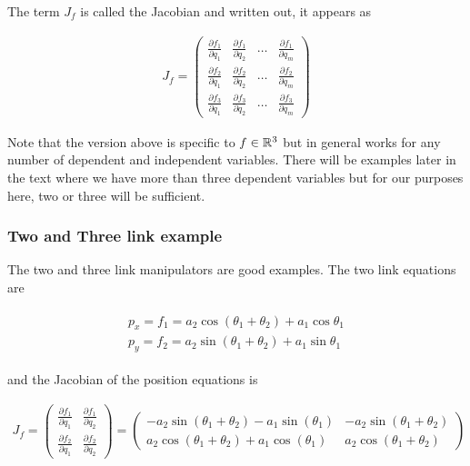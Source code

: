 The term \(J_f\) is called the Jacobian and written out, it appears as

\[\begin{aligned}
J_f = \begin{pmatrix}  \frac{\partial f_1} {\partial q_1} & \frac{\partial f_1} {\partial q_2} & \dots & \frac{\partial f_1} {\partial q_m} \\[3mm]
 \frac{\partial f_2} {\partial q_1} & \frac{\partial f_2} {\partial q_2} & \dots & \frac{\partial f_2} {\partial q_m} \\[3mm]
 \frac{\partial f_3} {\partial q_1} & \frac{\partial f_3} {\partial q_2} & \dots & \frac{\partial f_3} {\partial q_m} \end{pmatrix}
\end{aligned}\]

Note that the version above is specific to \(f \in {\Bbb R}^3\) but in
general works for any number of dependent and independent variables.
There will be examples later in the text where we have more than three
dependent variables but for our purposes here, two or three will be
sufficient.

\hypertarget{two-and-three-link-example}{%
\subsubsection{Two and Three link
example}\label{two-and-three-link-example}}

The two and three link manipulators are good examples. The two link
equations are

\[\begin{aligned}
\begin{matrix}
p_x = f_1 = a_2\cos (\theta_1+\theta_2) + a_1 \cos \theta_1 \\
p_y = f_2 = a_2 \sin (\theta_1 +\theta_2) + a_1\sin \theta_1
\end{matrix}
\end{aligned}\]

and the Jacobian of the position equations is

\[\begin{aligned}
J_f = \begin{pmatrix}  \frac{\partial f_1} {\partial q_1} & \frac{\partial f_1} {\partial q_2}  \\[2mm]
 \frac{\partial f_2} {\partial q_1} & \frac{\partial f_2} {\partial q_2}  \end{pmatrix}
 = \begin{pmatrix}  -a_2\sin(\theta_1+\theta_2) - a_1\sin(\theta_1) & -a_2\sin(\theta_1+\theta_2)  \\[2mm]
  a_2\cos (\theta_1+\theta_2) + a_1 \cos (\theta_1) & a_2\cos (\theta_1+\theta_2)  \end{pmatrix}
\end{aligned}\]


